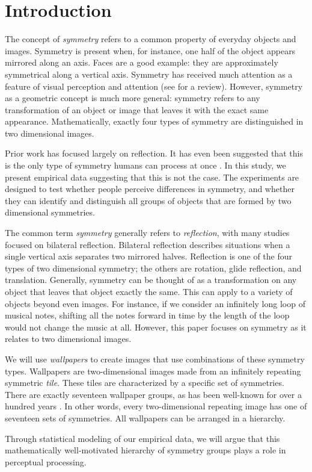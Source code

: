 \section{Introduction}
The concept of \emph{symmetry} refers to a common property of everyday objects and images. 
Symmetry is present when, for instance, one half of the object appears mirrored along an axis. Faces are a good example: they are approximately symmetrical along a vertical axis. Symmetry has received much attention as a feature of visual perception and attention (see \cite{review} for a review). However, symmetry as a geometric concept is much more general: symmetry refers to any transformation of an object or image that leaves it with the exact same appearance. Mathematically, exactly four types of symmetry are distinguished in two dimensional images.

Prior work has focused largely on reflection. It has even been suggested that this is the only type of symmetry humans can process at once \citet{bio}. In this study, we present empirical data suggesting that this is not the case. The experiments are designed to test whether people perceive differences in symmetry, and whether they can identify and distinguish all groups of objects that are formed by two dimensional symmetries. 

The common term \emph{symmetry} generally refers to \emph{reflection}, with many studies focused on bilateral reflection. Bilateral reflection describes situations when a single vertical axis separates two mirrored halves. Reflection is one of the four types of two dimensional symmetry; the others are rotation, glide reflection, and translation. Generally, symmetry can be thought of as a transformation on any object that leaves that object exactly the same. This can apply to a variety of objects beyond even images. For instance, if we consider an infinitely long loop of musical notes, shifting all the notes forward in time by the length of the loop would not change the music at all. However, this paper focuses on symmetry as it relates to two dimensional images.

We will use \emph{wallpapers} to create images that use combinations of these symmetry types. Wallpapers are two-dimensional images made from an infinitely repeating symmetric \textit{tile}. These tiles are characterized by a specific set of symmetries. There are exactly seventeen wallpaper groups, as has been well-known for over a hundred years \citet{wallpaper-proof}. In other words, every two-dimensional repeating image has one of seventeen sets of symmetries. All wallpapers can be arranged in a hierarchy. 

Through statistical modeling of our empirical data, we will argue that this mathematically well-motivated hierarchy of symmetry groups plays a role in perceptual processing. 